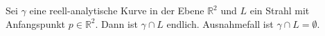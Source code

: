 \begin{satz}
%
%
    Sei $\gamma$ eine reell-analytische Kurve in der Ebene $\mathbb{R}^2$ und $L$ ein Strahl mit Anfangspunkt $p \in \mathbb{R}^2$.
    Dann ist $\gamma \cap L$ endlich. Ausnahmefall ist $\gamma \cap L = \emptyset$.
\end{satz}
